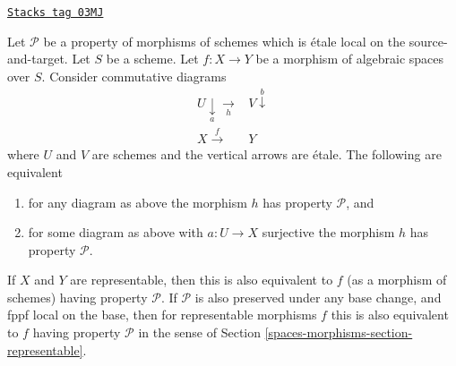 \begin{lemma}
\label{spaces-morphisms-lemma-local-source-target}
\href{https://stacks.math.columbia.edu/tag/03MJ}{\texttt{Stacks tag 03MJ}}

Let $\mathcal{P}$ be a property of morphisms of schemes
which is \'etale local on the source-and-target.
Let $S$ be a scheme.
Let $f : X \to Y$ be a morphism of algebraic spaces over $S$.
Consider commutative diagrams
$$
\begin{array}{cc}U \underset{a}{\downarrow}\underset{h}{\longrightarrow} & V \overset{b}{\downarrow} \\ X \overset{f}{\longrightarrow} & Y\end{array}
$$
where $U$ and $V$ are schemes and the vertical arrows are \'etale.
The following are equivalent
\begin{enumerate}
\item for any diagram as above the morphism $h$ has property
$\mathcal{P}$, and
\item for some diagram as above with $a : U \to X$ surjective
the morphism $h$ has property $\mathcal{P}$.
\end{enumerate}
If $X$ and $Y$ are representable, then this is also equivalent to
$f$ (as a morphism of schemes) having property $\mathcal{P}$.
If $\mathcal{P}$ is also preserved under any base change, and
fppf local on the base, then for representable morphisms $f$ this
is also equivalent to $f$ having property $\mathcal{P}$ in the sense
of Section \ref{spaces-morphisms-section-representable}.
\end{lemma}

